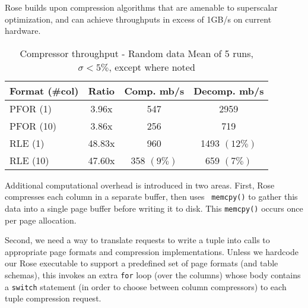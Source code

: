 \documentclass{vldb}
\newcommand{\rows}{Rose\xspace}
\begin{document}
\rows builds upon compression algorithms that are amenable to
superscalar optimization, and can achieve throughputs in excess of
1GB/s on current hardware.




\begin{table}
\caption{Compressor throughput - Random data Mean of 5 runs, $\sigma<5\%$, except where noted}
\centering
\label{table:perf}
\begin{tabular}{|l|c|c|c|} \hline
Format (\#col)    & Ratio & Comp. mb/s & Decomp. mb/s\\ \hline %
PFOR (1)      &    3.96x  &  547  &    2959 \\ \hline %
PFOR (10)     &    3.86x  &  256 &      719 \\ \hline %
RLE (1)       &   48.83x  &  960  &    1493 $(12\%)$ \\ \hline %
RLE (10)      &   47.60x  &  358 $(9\%)$ & 659 $(7\%)$ \\  %
\hline\end{tabular}
\end{table}


Additional computational overhead is introduced in two areas.  First,
\rows compresses each column in a separate buffer, then uses {\tt
  memcpy()} to gather this data into a single page buffer before
writing it to disk.  This {\tt memcpy()} occurs once per page
allocation.

Second, we need a way to translate requests to write a tuple into
calls to appropriate page formats and compression implementations.
Unless we hardcode our \rows executable to support a predefined set of
page formats (and table schemas), this invokes an extra {\tt for} loop
(over the columns) whose body contains a {\tt switch} statement (in
order to choose between column compressors) to each tuple compression
request.
\end{document}
